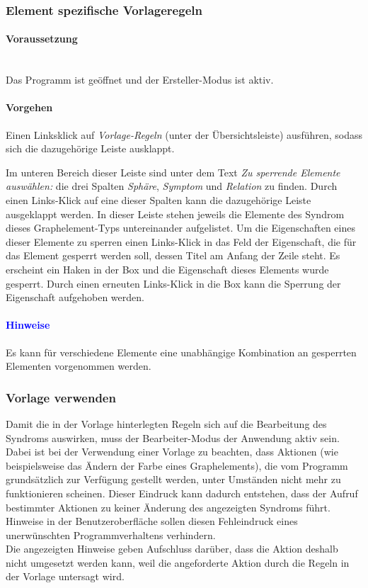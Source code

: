 \documentclass[enabledeprecatedfontcommands,fontsize=11pt,paper=a4,twoside]{scrartcl}
\newcounter{one}
\newcounter{two}[one]
\newcommand*{\hint}{\paragraph{\textcolor{blue}{Hinweise}}}
\newcommand*{\condition}{\paragraph{Voraussetzung}$\;$ \vspace{0.2cm}\\}
\newcommand*{\action}{\paragraph{Vorgehen}}
\let\tempone\itemize
\let\temptwo\enditemize
\renewenvironment{itemize}{\tempone\addtolength{\itemsep}{-10.0pt}}{\temptwo}
\let\origenumerate\enumerate
\let\origendenumerate\endenumerate
\renewenvironment{enumerate}{\origenumerate \addtolength{\itemsep}{-10.0pt}}{\origendenumerate}
\begin{document}
\subsubsection{Element spezifische Vorlageregeln}
	\condition 
	Das Programm ist geöffnet und der Ersteller-Modus ist aktiv.
	\action
	\begin{enumerate}
		\item Einen Linksklick auf \textit{Vorlage-Regeln} (unter der Übersichtsleiste) ausführen, sodass sich die dazugehörige Leiste ausklappt.
		\item Im unteren Bereich dieser Leiste sind unter dem Text \textit{Zu sperrende Elemente auswählen:} die drei Spalten \textit{Sphäre}, \textit{Symptom} und \textit{Relation} zu finden. Durch einen Links-Klick auf eine dieser Spalten kann die dazugehörige Leiste ausgeklappt werden. In dieser Leiste stehen jeweils die Elemente des Syndrom dieses Graphelement-Typs untereinander aufgelistet. Um die Eigenschaften eines dieser Elemente zu sperren einen Links-Klick in das Feld der Eigenschaft, die für das Element gesperrt werden soll, dessen Titel am Anfang der Zeile steht. Es erscheint ein Haken in der Box und die Eigenschaft dieses Elements wurde gesperrt. Durch einen erneuten Links-Klick in die Box kann die Sperrung der Eigenschaft aufgehoben werden.
	\end{enumerate} 
	\hint
	\begin{itemize}
		\item Es kann für verschiedene Elemente eine unabhängige Kombination an gesperrten Elementen vorgenommen werden. \\
	\end{itemize} 

\subsubsection{Vorlage verwenden}
Damit die in der Vorlage hinterlegten Regeln sich auf die Bearbeitung des Syndroms auswirken, muss der Bearbeiter-Modus der Anwendung aktiv sein.\\
Dabei ist bei der Verwendung einer Vorlage zu beachten, dass Aktionen (wie beispielsweise das Ändern der Farbe eines Graphelements), die vom Programm grundsätzlich zur Verfügung gestellt werden, unter Umständen nicht mehr zu funktionieren scheinen. Dieser Eindruck kann dadurch entstehen, dass der Aufruf bestimmter Aktionen zu keiner Änderung des angezeigten Syndroms führt. Hinweise in der Benutzeroberfläche sollen diesen Fehleindruck eines unerwünschten Programmverhaltens verhindern. \\
Die angezeigten Hinweise geben Aufschluss darüber, dass die Aktion deshalb nicht umgesetzt werden kann, weil die angeforderte Aktion durch die Regeln in der Vorlage untersagt wird. \\
\end{document}
